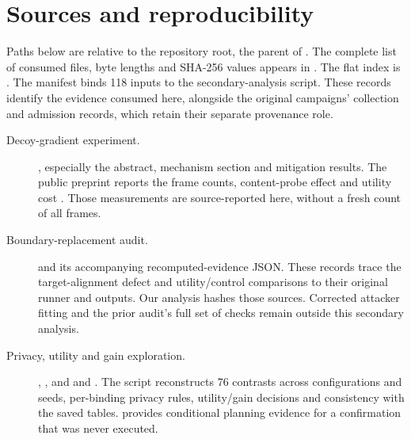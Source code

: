 \section{Sources and reproducibility}
\label{app:artifacts}

Paths below are relative to the repository root, the parent of
. The complete list of consumed files, byte lengths
and SHA-256 values appears in .
The flat index is . The manifest
binds 118 inputs to the secondary-analysis script. These records identify
the evidence consumed here, alongside the original campaigns' collection
and admission records, which retain their separate provenance role.

\begin{description}
\item[\hypertarget{artifact-E1}{Decoy-gradient experiment.}]
, especially the abstract,
mechanism section and mitigation results. The public preprint reports the
frame counts, content-probe effect and utility cost \cite{paper1}.
Those measurements are source-reported here, without a fresh count of
all frames.

\item[\hypertarget{artifact-B1}{Boundary-replacement audit.}]
and its accompanying recomputed-evidence JSON. These records trace the
target-alignment defect and utility/control comparisons to their original
runner and outputs. Our analysis hashes those sources. Corrected attacker
fitting and the prior audit's full set of checks remain outside this
secondary analysis.

\item[\hypertarget{artifact-R1}{Privacy, utility and gain exploration.}]
,
, and
 and
.
The script reconstructs 76 contrasts across configurations and seeds,
per-binding privacy rules, utility/gain decisions and consistency with
the saved tables.
provides conditional planning evidence for a confirmation that was never
executed.


\end{description}
